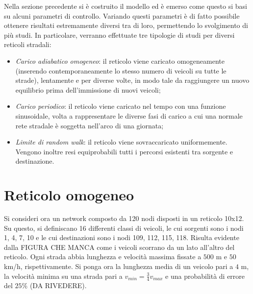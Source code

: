 \documentclass[../main.tex]{subfiles}
\begin{document}
Nella sezione precedente si \`e costruito il modello ed \`e emerso come questo si basi su alcuni parametri di controllo.
Variando questi parametri \`e di fatto possibile ottenere risultati estremamente diversi tra di loro, permettendo lo svolgimento di pi\`u studi.
In particolare, verranno effettuate tre tipologie di studi per diversi reticoli stradali:
\begin{itemize}
    \item \emph{Carico adiabatico omogeneo}: il reticolo viene caricato omogeneamente (inserendo contemporaneamente lo stesso numero di veicoli su tutte le strade), lentamente e per diverse volte, in modo tale da raggiungere un nuovo equilibrio prima dell'immissione di nuovi veicoli;
    \item \emph{Carico periodico}: il reticolo viene caricato nel tempo con una funzione sinusoidale, volta a rappresentare le diverse fasi di carico a cui una normale rete stradale \`e soggetta nell'arco di una giornata;
    \item \emph{Limite di random walk}: il reticolo viene sovraccaricato uniformemente. Vengono inoltre resi equiprobabili tutti i percorsi esistenti tra sorgente e destinazione.
\end{itemize}

\section{Reticolo omogeneo}
Si consideri ora un network composto da 120 nodi disposti in un reticolo 10x12.
Su questo, si definiscano 16 differenti classi di veicoli, le cui sorgenti sono i nodi 1, 4, 7, 10 e le cui destinazioni sono i nodi 109, 112, 115, 118.
Risulta evidente dalla FIGURA CHE MANCA come i veicoli scorrano da un lato all'altro del reticolo.
Ogni strada abbia lunghezza e velocit\`a massima fissate a $500$ m e $50$ km/h, rispettivamente.
Si ponga ora la lunghezza media di un veicolo pari a $4$ m, la velocit\`a minima su una strada pari a $v_{min}=\frac{3}{4}v_{max}$ e una probabilit\`a di errore del $25$\% (DA RIVEDERE).
\end{document}
